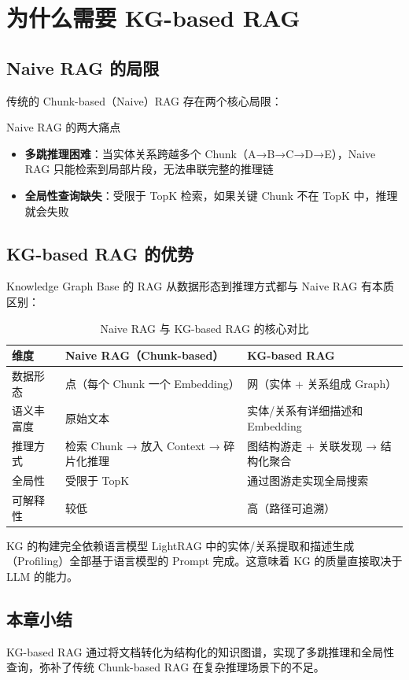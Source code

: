 \section{为什么需要 KG-based RAG}

\subsection{Naive RAG 的局限}

传统的 Chunk-based（Naive）RAG 存在两个核心局限：

\begin{importantbox}{Naive RAG 的两大痛点}
\begin{itemize}
    \item \textbf{多跳推理困难}：当实体关系跨越多个 Chunk（A→B→C→D→E），Naive RAG 只能检索到局部片段，无法串联完整的推理链
    \item \textbf{全局性查询缺失}：受限于 TopK 检索，如果关键 Chunk 不在 TopK 中，推理就会失败
\end{itemize}
\end{importantbox}

\subsection{KG-based RAG 的优势}

Knowledge Graph Base 的 RAG 从数据形态到推理方式都与 Naive RAG 有本质区别：

\begin{table}[H]
\centering
\begin{tabular}{p{3cm}p{5cm}p{5cm}}
\toprule
\textbf{维度} & \textbf{Naive RAG（Chunk-based）} & \textbf{KG-based RAG} \\
\midrule
数据形态 & 点（每个 Chunk 一个 Embedding） & 网（实体 + 关系组成 Graph） \\
语义丰富度 & 原始文本 & 实体/关系有详细描述和 Embedding \\
推理方式 & 检索 Chunk → 放入 Context → 碎片化推理 & 图结构游走 + 关联发现 → 结构化聚合 \\
全局性 & 受限于 TopK & 通过图游走实现全局搜索 \\
可解释性 & 较低 & 高（路径可追溯） \\
\bottomrule
\end{tabular}
\caption{Naive RAG 与 KG-based RAG 的核心对比}
\end{table}

\begin{knowledgebox}{KG 的构建完全依赖语言模型}
LightRAG 中的实体/关系提取和描述生成（Profiling）全部基于语言模型的 Prompt 完成。这意味着 KG 的质量直接取决于 LLM 的能力。
\end{knowledgebox}

\subsection{本章小结}

KG-based RAG 通过将文档转化为结构化的知识图谱，实现了多跳推理和全局性查询，弥补了传统 Chunk-based RAG 在复杂推理场景下的不足。



